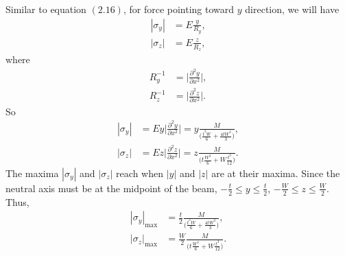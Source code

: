 \documentclass[12pt]{article}
\begin{document}
\begin{enumerate}[(a)]
	      Similar to equation $(2.16)$, for force pointing toward $y$ direction, we will have
	      \begin{align}
		      | \sigma_y | & = E \frac{ y }{ R_y }, \\
		      | \sigma_z | & = E \frac{ z }{ R_z },
	      \end{align}
	      where
	      \begin{align}
		      R_y^{-1} & = \bigg| \frac{ \partial^2 y }{ \partial x^2 } \bigg|, \\
		      R_z^{-1} & = \bigg| \frac{ \partial^2 z }{ \partial  x^2} \bigg|.
	      \end{align}
	      So
	      \begin{align}
		      | \sigma_y | & = E y \bigg| \frac{ \partial^2 y }{ \partial x^2 } \bigg| = y \frac{ M }{ \big( \frac{t^3 W}{6} + \frac{4 t W^3}{3} \big)},        \\
		      | \sigma_z | & = E z \bigg| \frac{ \partial^2 z }{ \partial  x^2} \bigg| = z \frac{ M }{ \big( t \frac{ W^3 }{ 6 } + W \frac{ t^3 }{ 12 } \big)}.
	      \end{align}
	      The maxima $|\sigma_y|$ and $|\sigma_z|$ reach when $|y|$ and $|z|$ are at their maxima.
	      Since the neutral axis must be at the midpoint of the beam,
	      $-\frac{ t }{ 2 } \le y \le \frac{ t }{ 2 }$, $-\frac{ W }{ 2 } \le z \le \frac{ W }{ 2 }$. Thus,
	      \begin{align}
	      | \sigma_y |_\text{max} & = \frac{ t }{ 2 } \frac{ M }{ \big( \frac{t^3 W}{6} + \frac{4 t W^3}{3} \big)},        \\
	      | \sigma_z |_\text{max} & = \frac{ W }{ 2 } \frac{ M }{ \big( t \frac{ W^3 }{ 6 } + W \frac{ t^3 }{ 12 } \big)}.
	      \end{align}
\end{enumerate}

% 
% 

\end{document}
